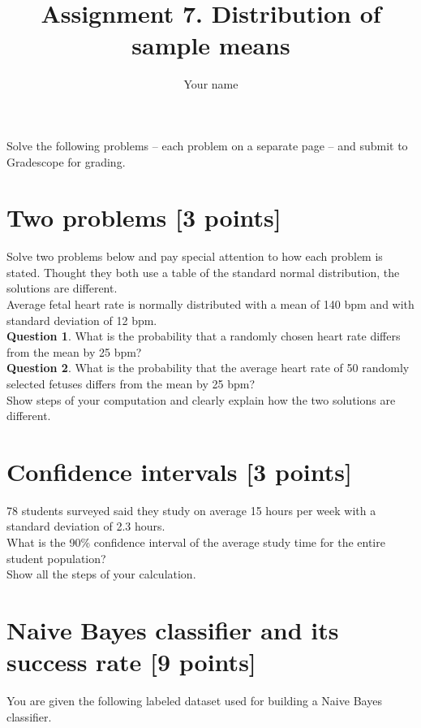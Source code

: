 \documentclass{article}
\title{Assignment 7. Distribution of sample means}
\author{Your name}
\begin{document}
\maketitle


Solve the following problems -- each problem on a separate page -- and submit to Gradescope for grading. 

\newpage
\section{Two problems [3 points]}
Solve two problems below and pay special attention to how each problem is stated. Thought they both use a table of the standard normal distribution, the solutions are different.\\

Average fetal heart rate is normally distributed with a mean of 140 bpm and with standard deviation of 12 bpm.\\ 

{\bf Question 1}. What is the probability that a randomly chosen heart rate differs from the mean by 25 bpm?\\

{\bf Question 2}. What is the probability that the average heart rate of 50 randomly selected fetuses differs from the mean by 25 bpm?\\


Show steps of your computation and clearly explain how the two solutions are different.

\newpage
\section{Confidence intervals [3 points]}
78 students surveyed said they study on average 15 hours per week with a standard deviation of 2.3 hours.\\ 

\noindent What is the 90\% confidence interval of the average study time for the entire student population?\\


Show all the steps of your calculation. 

\newpage
\section{Naive Bayes classifier and its success rate [9 points]}
You are given the following labeled dataset used for building a Naive Bayes classifier.\\
\end{document}

